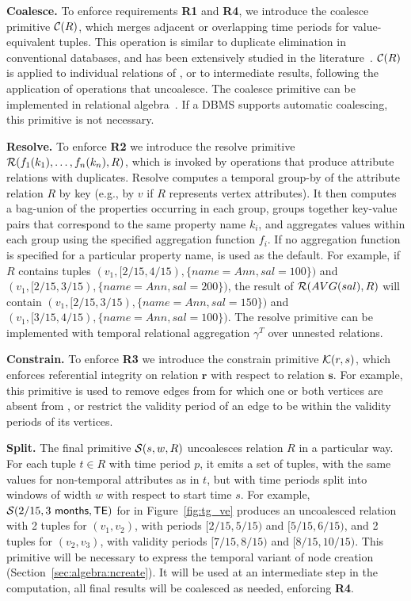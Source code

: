 {\bf Coalesce.} To enforce requirements {\bf R1} and {\bf R4}, we
introduce the coalesce primitive $\mathcal{C}(R)$, which merges adjacent or
overlapping time periods for value-equivalent tuples.  This operation
is similar to duplicate elimination in conventional databases, and has
been extensively studied in the
literature~\cite{DBLP:conf/vldb/BohlenSS96,DBLP:journals/sigmod/Zimanyi06}.
$\mathcal{C}(R)$ is applied to individual relations of \tve, or to
intermediate results, following the application of operations that
uncoalesce.
%
The coalesce primitive can be implemented in relational
algebra~\cite{DBLP:conf/vldb/BohlenSS96}.  If a DBMS supports
automatic coalescing, this primitive is not necessary.

{\bf Resolve.} To enforce {\bf R2} we introduce the resolve primitive
$\mathcal{R}(f_1(k_1), \ldots, f_n(k_n),R)$, which is invoked by
operations that produce attribute relations with duplicates.  Resolve
computes a temporal group-by of the attribute relation $R$ by key
(e.g., by $v$ if $R$ represents vertex attributes).  It then computes
a bag-union of the properties occurring in each group, groups together
key-value pairs that correspond to the same property name $k_i$, and
aggregates values within each group using the specified aggregation
function $f_i$.  If no aggregation function is specified for a
particular property name,  is used as the default.  For
example, if $R$ contains tuples $(v_1, [2/15,4/15),
  \{name=Ann,sal=100\})$ and $(v_1, [2/15, 3/15),
    \{name=Ann,sal=200\})$, the result of $\mathcal{R}(AVG(sal),R)$ will
    contain $(v_1, [2/15,3/15), \{name=Ann,sal=150\})$ and $(v_1,
      [3/15,4/15), \{name=Ann,sal=100\})$.  The resolve primitive can
        be implemented with temporal relational aggregation $\gamma^T$
        over unnested relations.

{\bf Constrain.} To enforce {\bf R3} we introduce the constrain
primitive $\mathcal{K}(r,s)$, which enforces referential integrity on
relation $\mathbf{r}$ with respect to relation $\mathbf{s}$.  For
example, this primitive is used to remove edges from \te for which one
or both vertices are absent from \tv, or restrict the validity period
of an edge to be within the validity periods of its vertices.

{\bf Split.} The final primitive $\mathcal{S}(s,w,R)$ uncoalesces
relation $R$ in a particular way.  For each tuple $t \in R$ with time
period $p$, it emits a set of tuples, with the same values for
non-temporal attributes as in $t$, but with time periods split into
windows of width $w$ with respect to start time $s$.  For example,
$\mathcal{S}(2/15,3~\textsf{months},\textsf{TE})$ for  in
Figure~\ref{fig:tg_ve} produces an uncoalesced relation with 2 tuples
for $(v_1, v_2)$, with periods $[2/15, 5/15)$ and $[5/15, 6/15)$, and
    2 tuples for $(v_2, v_3)$, with validity periods $[7/15, 8/15)$
      and $[8/15, 10/15)$.  This primitive will be necessary to
        express the temporal variant of node creation
        (Section~\ref{sec:algebra:ncreate}).  It will be used
        at an intermediate step in the computation, all final results
        will be coalesced as needed, enforcing {\bf R4}.

